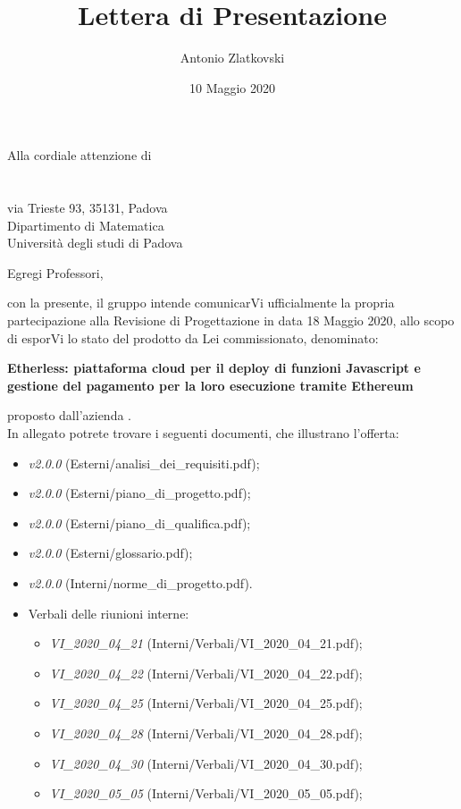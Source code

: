 \documentclass[a4paper]{letter}
\title{Lettera di Presentazione}
\author{Antonio Zlatkovski}
\begin{document}
\begin{letter} {Alla cordiale attenzione di \\ \TV \\ \RC \\ via Trieste 93, 35131, Padova\\ Dipartimento di Matematica \\ Università degli studi di Padova }
  \vspace*{-0.4\baselineskip}
\date{10 Maggio 2020}
\opening{Egregi Professori,}
con la presente, il gruppo \Gruppo{} intende comunicarVi ufficialmente la propria partecipazione alla Revisione di Progettazione in data 18 Maggio 2020, allo scopo di esporVi lo stato del prodotto da Lei commissionato, denominato:
  \begin{center}
    \textbf{Etherless: piattaforma cloud per il deploy di funzioni Javascript e gestione del pagamento per la loro esecuzione tramite Ethereum}
  \end{center}
  proposto dall'azienda \Proponente.\\
  In allegato potrete trovare i seguenti documenti, che illustrano l'offerta:
  \begin{itemize}
    \item \AdR{} \textit{v2.0.0} (Esterni/analisi\_dei\_requisiti.pdf);
    \item \PdP{} \textit{v2.0.0} (Esterni/piano\_di\_progetto.pdf);
    \item \PdQ{} \textit{v2.0.0} (Esterni/piano\_di\_qualifica.pdf);
    \item \Glossario{} \textit{v2.0.0} (Esterni/glossario.pdf);
    \item \NdP{} \textit{v2.0.0} (Interni/norme\_di\_progetto.pdf).
    \item Verbali delle riunioni interne:
      \begin{itemize}
				\item \textit{VI\_2020\_04\_21} (Interni/Verbali/VI\_2020\_04\_21.pdf);
				\item \textit{VI\_2020\_04\_22} (Interni/Verbali/VI\_2020\_04\_22.pdf);
				\item \textit{VI\_2020\_04\_25} (Interni/Verbali/VI\_2020\_04\_25.pdf);
				\item \textit{VI\_2020\_04\_28} (Interni/Verbali/VI\_2020\_04\_28.pdf);
				\item \textit{VI\_2020\_04\_30} (Interni/Verbali/VI\_2020\_04\_30.pdf);
				\item \textit{VI\_2020\_05\_05} (Interni/Verbali/VI\_2020\_05\_05.pdf);

\end{itemize}
\end{itemize}
\end{letter}
\end{document}

